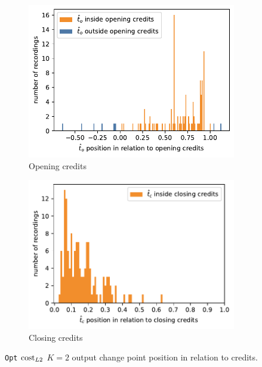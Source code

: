 \begin{figure}[h]
  \begin{subfigure}[t]{.49\textwidth}
    \centering
    \includegraphics[width=\linewidth]{../plots/distances/relative_opening_opt.pdf}
    \caption{Opening credits}
    \label{fig:relative_opening_opt}
  \end{subfigure}
  \hfill
  \begin{subfigure}[t]{.49\textwidth}
    \centering
    \includegraphics[width=\linewidth]{../plots/distances/relative_closing_opt.pdf}
    \caption{Closing credits}
    \label{fig:relative_closing_opt}
  \end{subfigure}
  \caption{\texttt{Opt} $\operatorname{cost}_{L2}$ $K=2$  output change point position in relation to credits.}
  \label{fig:relative_opt}
\end{figure}

